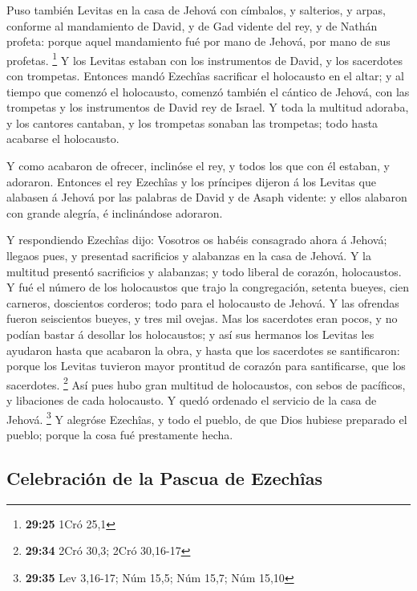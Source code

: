  Puso también Levitas en la casa de Jehová con címbalos,
y salterios, y arpas, conforme al mandamiento de David, y de Gad vidente
del rey, y de Nathán profeta: porque aquel mandamiento fué por mano de
Jehová, por mano de sus profetas. \footnote{\textbf{29:25} 1Cró 25,1}
 Y los Levitas estaban con los instrumentos de David, y
los sacerdotes con trompetas.  Entonces mandó Ezechîas
sacrificar el holocausto en el altar; y al tiempo que comenzó el
holocausto, comenzó también el cántico de Jehová, con las trompetas y
los instrumentos de David rey de Israel.  Y toda la
multitud adoraba, y los cantores cantaban, y los trompetas sonaban las
trompetas; todo hasta acabarse el holocausto.

 Y como acabaron de ofrecer, inclinóse el rey, y todos
los que con él estaban, y adoraron.  Entonces el rey
Ezechîas y los príncipes dijeron á los Levitas que alabasen á Jehová por
las palabras de David y de Asaph vidente: y ellos alabaron con grande
alegría, é inclinándose adoraron.

 Y respondiendo Ezechîas dijo: Vosotros os habéis
consagrado ahora á Jehová; llegaos pues, y presentad sacrificios y
alabanzas en la casa de Jehová. Y la multitud presentó sacrificios y
alabanzas; y todo liberal de corazón, holocaustos.  Y fué
el número de los holocaustos que trajo la congregación, setenta bueyes,
cien carneros, doscientos corderos; todo para el holocausto de Jehová.
 Y las ofrendas fueron seiscientos bueyes, y tres mil
ovejas.  Mas los sacerdotes eran pocos, y no podían
bastar á desollar los holocaustos; y así sus hermanos los Levitas les
ayudaron hasta que acabaron la obra, y hasta que los sacerdotes se
santificaron: porque los Levitas tuvieron mayor prontitud de corazón
para santificarse, que los sacerdotes. \footnote{\textbf{29:34} 2Cró
  30,3; 2Cró 30,16-17}  Así pues hubo gran multitud de
holocaustos, con sebos de pacíficos, y libaciones de cada holocausto. Y
quedó ordenado el servicio de la casa de Jehová. \footnote{\textbf{29:35}
  Lev 3,16-17; Núm 15,5; Núm 15,7; Núm 15,10}  Y alegróse
Ezechîas, y todo el pueblo, de que Dios hubiese preparado el pueblo;
porque la cosa fué prestamente hecha.

\hypertarget{celebraciuxf3n-de-la-pascua-de-ezechuxeeas}{%
\subsection{Celebración de la Pascua de
Ezechîas}\label{celebraciuxf3n-de-la-pascua-de-ezechuxeeas}}

